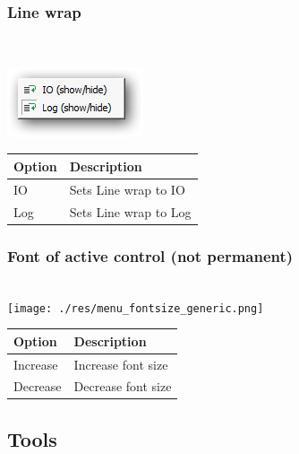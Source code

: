 \hypertarget{menu_view_r_rterm_linewrap}{}
\subsubsection{Line wrap}\\

\includegraphics[scale=0.50]{./res/menu_r_rterm_linewrap.png}\\

\begin{scriptsize}\begin{tabularx}{\textwidth}{>{\hsize=0.3\hsize}X>{\hsize=0.7\hsize}X}\\
    \hline
    \textbf{Option} & \textbf{Description} \\
    \hline
    IO & Sets Line wrap to IO \\
    Log & Sets Line wrap to Log \\
    \hline
  \end{tabularx}\end{scriptsize}


\hypertarget{menu_r_rterm_fontsize}{}
\subsubsection{Font of active control (not permanent)}\\

\texttt{[image: ./res/menu\_fontsize\_generic.png]}\\

\begin{scriptsize}\begin{tabularx}{\textwidth}{>{\hsize=0.3\hsize}X>{\hsize=0.7\hsize}X}\\
    \hline
    \textbf{Option} & \textbf{Description} \\
    \hline
    Increase & Increase font size \\
    Decrease & Decrease font size \\
    \hline
  \end{tabularx}\end{scriptsize}


\hypertarget{menu_view_tools}{}
\subsection{Tools}


